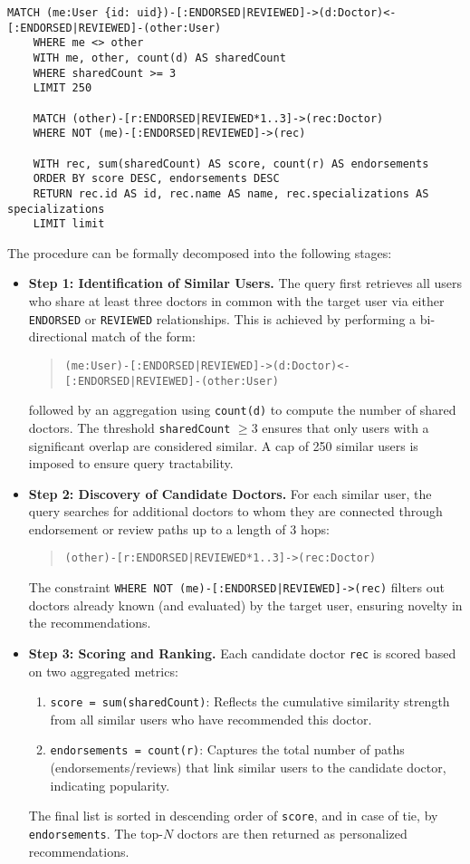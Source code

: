 \begin{lstlisting}[language=cypher]
	MATCH (me:User {id: uid})-[:ENDORSED|REVIEWED]->(d:Doctor)<-[:ENDORSED|REVIEWED]-(other:User)
	WHERE me <> other
	WITH me, other, count(d) AS sharedCount
	WHERE sharedCount >= 3
	LIMIT 250
	
	MATCH (other)-[r:ENDORSED|REVIEWED*1..3]->(rec:Doctor)
	WHERE NOT (me)-[:ENDORSED|REVIEWED]->(rec)
	
	WITH rec, sum(sharedCount) AS score, count(r) AS endorsements
	ORDER BY score DESC, endorsements DESC
	RETURN rec.id AS id, rec.name AS name, rec.specializations AS specializations
	LIMIT limit
\end{lstlisting}

The procedure can be formally decomposed into the following stages:

\begin{itemize}
	\item \textbf{Step 1: Identification of Similar Users.} The query first retrieves all users who share at least three doctors in common with the target user via either \texttt{ENDORSED} or \texttt{REVIEWED} relationships. This is achieved by performing a bi-directional match of the form:
	\begin{quote}
		\texttt{(me:User)-[:ENDORSED|REVIEWED]->(d:Doctor)<-[:ENDORSED|REVIEWED]-(other:User)}
	\end{quote}
	followed by an aggregation using \texttt{count(d)} to compute the number of shared doctors. The threshold \texttt{sharedCount} $\geq 3$ ensures that only users with a significant overlap are considered similar. A cap of 250 similar users is imposed to ensure query tractability.
	
	\item \textbf{Step 2: Discovery of Candidate Doctors.} For each similar user, the query searches for additional doctors to whom they are connected through endorsement or review paths up to a length of 3 hops:
	\begin{quote}
		\texttt{(other)-[r:ENDORSED|REVIEWED*1..3]->(rec:Doctor)}
	\end{quote}
	The constraint \texttt{WHERE NOT (me)-[:ENDORSED|REVIEWED]->(rec)} filters out doctors already known (and evaluated) by the target user, ensuring novelty in the recommendations.
	
	\item \textbf{Step 3: Scoring and Ranking.} Each candidate doctor \texttt{rec} is scored based on two aggregated metrics:
	\begin{enumerate}
		\item \texttt{score = sum(sharedCount)}: Reflects the cumulative similarity strength from all similar users who have recommended this doctor.
		\item \texttt{endorsements = count(r)}: Captures the total number of paths (endorsements/reviews) that link similar users to the candidate doctor, indicating popularity.
	\end{enumerate}
	The final list is sorted in descending order of \texttt{score}, and in case of tie, by \texttt{endorsements}. The top-$N$ doctors are then returned as personalized recommendations.
	
\end{itemize}

